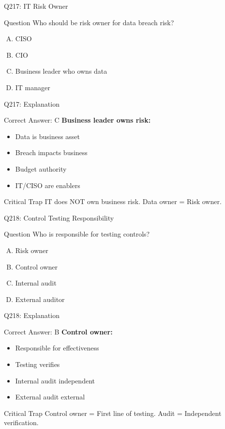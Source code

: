 \documentclass{beamer}
\begin{document}
	\begin{frame}{Q217: IT Risk Owner}
		\begin{block}{Question}
			Who should be risk owner for data breach risk?
		\end{block}
		\begin{enumerate}[(A)]
			\item CISO
			\item CIO
			\item Business leader who owns data
			\item IT manager
		\end{enumerate}
	\end{frame}
	
	\begin{frame}{Q217: Explanation}
		\begin{block}{Correct Answer: C}
			\textbf{Business leader owns risk:}
			\begin{itemize}
				\item Data is business asset
				\item Breach impacts business
				\item Budget authority
				\item IT/CISO are enablers
			\end{itemize}
		\end{block}
		\begin{alertblock}{Critical Trap}
			IT does NOT own business risk.
			Data owner = Risk owner.
		\end{alertblock}
	\end{frame}
	
	\begin{frame}{Q218: Control Testing Responsibility}
		\begin{block}{Question}
			Who is responsible for testing controls?
		\end{block}
		\begin{enumerate}[(A)]
			\item Risk owner
			\item Control owner
			\item Internal audit
			\item External auditor
		\end{enumerate}
	\end{frame}
	
	\begin{frame}{Q218: Explanation}
		\begin{block}{Correct Answer: B}
			\textbf{Control owner:}
			\begin{itemize}
				\item Responsible for effectiveness
				\item Testing verifies
				\item Internal audit independent
				\item External audit external
			\end{itemize}
		\end{block}
		\begin{alertblock}{Critical Trap}
			Control owner = First line of testing.
			Audit = Independent verification.
		\end{alertblock}
	\end{frame}
	
\end{document}
